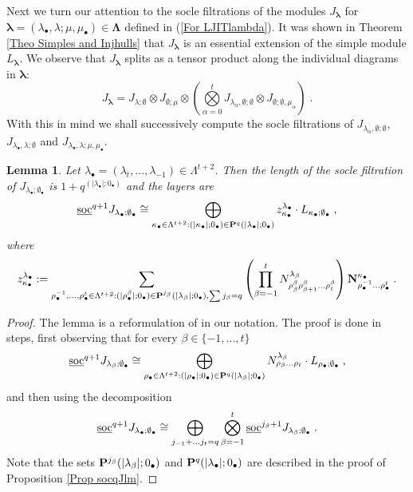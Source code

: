 \documentclass[12pt]{article}
\def\ul  {\underline}
\newtheorem{lemma}[theorem]{Lemma}
\begin{document}
Next we turn our attention to the socle filtrations of the modules $J_{\bm\lambda}$ for $\bm\lambda=(\lambda_\bullet,\lambda;\mu,\mu_\bullet)\in\bm\Lambda$ defined in (\ref{For LJITlambda}). It was shown in Theorem \ref{Theo Simples and Injhulls} that $J_{\bm\lambda}$ is an essential extension of the simple module $L_{\bm\lambda}$. We observe that $J_{\bm\lambda}$ splits as a tensor product along the individual diagrams in $\bm\lambda$:
$$
J_{\bm\lambda} = J_{\lambda;\emptyset}\otimes J_{\emptyset;\mu}\otimes (\bigotimes\limits_{\alpha=0}^t J_{\lambda_\alpha,\emptyset;\emptyset}\otimes J_{\emptyset;\emptyset,\mu_\alpha})\;.
$$
With this in mind we shall successively compute the socle filtrations of $J_{\lambda_\alpha,\emptyset;\emptyset}$, $J_{\lambda_\bullet,\lambda;\emptyset}$ and $J_{\lambda_\bullet,\lambda;\mu,\mu_\bullet}$.

\begin{lemma}\label{Lemma soc q Jlambda}
Let $\lambda_\bullet=(\lambda_t,...,\lambda_{-1})\in\Lambda^{t+2}$. Then the length of the socle filtration of $J_{\lambda_\bullet;\emptyset_\bullet}$ is $1+q^{(|\lambda_\bullet|;0_\bullet)}$ and the layers are
\begin{gather*}
\ul{\rm soc}^{q+1}J_{\lambda_\bullet;\emptyset_\bullet} \cong \bigoplus\limits_{\kappa_\bullet\in\Lambda^{t+2}:(|\kappa_\bullet|;0_\bullet)\in{\bf P}^q(|\lambda_\bullet|;0_\bullet)} z^{\lambda_{\bullet}}_{\kappa_\bullet} \cdot L_{\kappa_\bullet;\emptyset_\bullet} \;,
\end{gather*}
where
$$
z^{\lambda_\bullet}_{\kappa_\bullet} := \sum\limits_{\rho^{-1}_\bullet,...,\rho^{t}_\bullet\in\Lambda^{t+2}:(|\rho^{\beta}_\bullet|;0_\bullet)\in{\bf P}^{j_\beta}(|\lambda_\beta|;0_\bullet),\sum j_\beta=q} \left( \prod\limits_{\beta=-1}^t N^{\lambda_{\beta}}_{\rho^{\beta}_{\beta}\rho^{\beta}_{\beta+1}...\rho^{\beta}_t} \right) {\bf N}^{\kappa_\bullet}_{\rho^{-1}_\bullet...\rho^{t}_\bullet} \;.
$$
\end{lemma}

\begin{proof}
The lemma is a reformulation of \cite[Proposition~4.30]{Chirvasitu-Penkov-RC} in our notation. The proof is done in steps, first observing that for every $\beta\in\{-1,...,t\}$
\begin{gather*}
\ul{\rm soc}^{q+1}J_{\lambda_\beta;\emptyset_\bullet} \cong \bigoplus\limits_{\rho_\bullet\in\Lambda^{t+2}:(|\rho_\bullet|;0_\bullet)\in{\bf P}^q(|\lambda_\beta|;0_\bullet)} N^{\lambda_{\beta}}_{\rho_\beta...\rho_t} \cdot L_{\rho_\bullet;\emptyset_\bullet} \;,\\
\end{gather*}
and then using the decomposition
$$
\ul{\rm soc}^{q+1}J_{\lambda_\bullet;\emptyset_\bullet} \cong \bigoplus\limits_{j_{-1}+...j_t=q} \bigotimes\limits_{\beta=-1}^t \ul{\rm soc}^{j_\beta+1}J_{\lambda_\beta;\emptyset_\bullet} \;.
$$
Note that the sets ${\bf P}^{j_\beta}(|\lambda_\beta|;0_\bullet)$ and ${\bf P}^{q}(|\lambda_\bullet|;0_\bullet)$ are described in the proof of Proposition \ref{Prop socqJlm}.
\end{proof}
\end{document}

